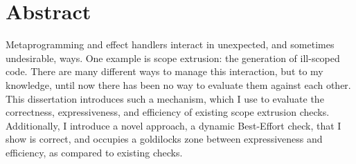 \chapter*{Abstract}
Metaprogramming and effect handlers interact in unexpected, and sometimes undesirable, ways. One example is scope extrusion: the generation of ill-scoped code. There are many different ways to manage this interaction, but to my knowledge, until now there has been no way to evaluate them against each other. This dissertation introduces such a mechanism, which I use to evaluate the correctness, expressiveness, and efficiency of existing scope extrusion checks. Additionally, I introduce a novel approach, a dynamic Best-Effort check, that I show is correct, and occupies a goldilocks zone between expressiveness and efficiency, as compared to existing checks. 